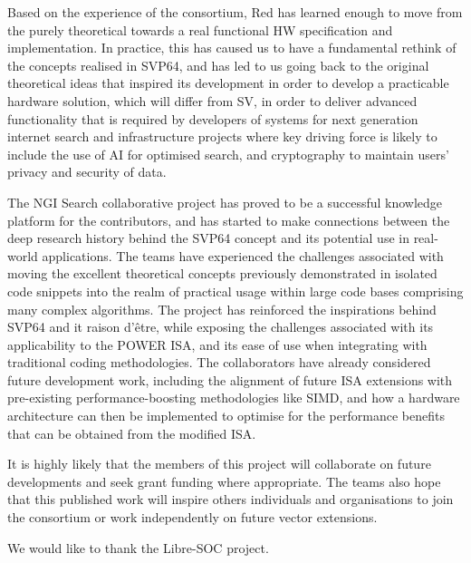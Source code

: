 Based on the experience of the consortium, Red has learned enough to move from
the purely theoretical towards a real functional HW specification
and implementation.
In practice, this has caused us to have a fundamental rethink of the concepts
realised in SVP64, and has led to us going back to the original theoretical
ideas that inspired its development in order to develop a practicable hardware
solution, which will differ from \acrshort{SV}, in order to deliver
advanced functionality that is required by developers of systems for next
generation internet search and infrastructure projects where key driving force
is likely to include the use of AI for optimised search, and cryptography to
maintain users' privacy and security of data.

The NGI Search collaborative project has proved to be a successful knowledge
platform for the contributors, and has started to make connections between the
deep research history behind the SVP64 concept and its potential use in
real-world applications. The teams have experienced the challenges associated
with moving the excellent theoretical concepts previously demonstrated in
isolated code snippets into the realm of practical usage within large code
bases comprising many complex algorithms. The project has reinforced the
inspirations behind SVP64 and it raison d’être, while exposing the challenges
associated with its applicability to the POWER ISA, and its ease of use when
integrating with traditional coding methodologies. The collaborators have
already considered future development work, including the alignment of future
ISA extensions with pre-existing performance-boosting methodologies like SIMD,
and how a hardware architecture can then be implemented to optimise for the
performance benefits that can be obtained from the modified ISA.

It is highly likely that the members of this project will collaborate on future
developments and seek grant funding where appropriate. The teams also hope that
this published work will inspire others individuals and organisations to join
the consortium or work independently on future vector extensions.

We would like to thank the Libre-SOC project.
